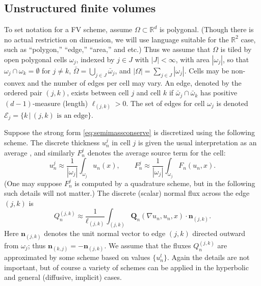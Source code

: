 \documentclass[final,onefignum]{siamart190516}
\newcommand\bn{\mathbf{n}}
\newcommand\bQ{\mathbf{Q}}
\newcommand{\grad}{\nabla}
\newcommand\RR{\mathbb{R}}
\begin{document}
\subsection{Unstructured finite volumes} \label{subsec:spacenotation}  To set notation for a FV scheme, assume $\Omega \subset \RR^d$ is polygonal.  (Though there is no actual restriction on dimension, we will use language suitable for the $\RR^2$ case, such as ``polygon,'' ``edge,'' ``area,'' and etc.)  Thus we assume that $\Omega$ is tiled by open polygonal cells $\omega_j$, indexed by $j\in J$ with $|J|<\infty$, with area $|\omega_j|$, so that $\omega_j \cap \omega_k = \emptyset$ for $j\ne k$, $\bar\Omega = \bigcup_{j\in J} \bar \omega_j$, and $|\Omega| = \sum_{j\in J} |\omega_j|$.  Cells may be non-convex and the number of edges per cell may vary.  An edge, denoted by the ordered pair $(j,k)$, exists between cell $j$ and cell $k$ if $\bar\omega_j \cap \bar \omega_k$ has positive $(d-1)$-measure (length) $\ell_{(j,k)}>0$.  The set of edges for cell $\omega_j$ is denoted $\mathcal{E}_j=\{k\,\big|\,(j,k) \text{ is an edge}\}$.

Suppose the strong form \eqref{eq:semimassconserve} is discretized using the following scheme.  The discrete thickness $u_n^j$ in cell $j$ is given the usual interpretation as an average \cite{LeVeque2002}, and similarly $F_n^j$ denotes the average source term for the cell:
\begin{equation}
u_n^j \approx \frac{1}{|\omega_j|} \int_{\omega_j} u_n(x), \qquad F_n^j \approx \frac{1}{|\omega_j|} \int_{\omega_j} F_n(u_n,x).  \label{eq:fvthickness}
\end{equation}
(One may suppose $F_n^j$ is computed by a quadrature scheme, but in the following such details will not matter.)  The discrete (scalar) normal flux across the edge $(j,k)$ is
\begin{equation}
Q_n^{(j,k)} \approx \frac{1}{\ell_{(j,k)}} \int_{(j,k)} \bQ_n(\grad u_n,u_n,x) \cdot \bn_{(j,k)}. \label{eq:fvflux}
\end{equation}
Here $\bn_{(j,k)}$ denotes the unit normal vector to edge $(j,k)$ directed outward from $\omega_j$; thus $\bn_{(k,j)} = -\bn_{(j,k)}$.  We assume that the fluxes $Q_n^{(j,k)}$ are approximated by some scheme based on values $\{u_n^l\}$.  Again the details are not important, but of course a variety of schemes can be applied in the hyperbolic \cite{LeVeque2002} and general (diffusive, implicit) \cite{Morton2018} cases.
\end{document}
